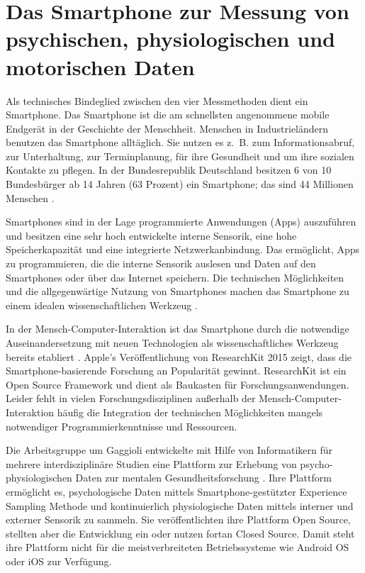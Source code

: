 

\section{Das Smartphone zur Messung von psychischen, physiologischen und motorischen Daten} 

\label{sec:das_smartphone_zur_messung_von_psychischen_physiologischen_und_motorischen_daten}

Als technisches Bindeglied zwischen den vier Messmethoden dient ein Smartphone. Das Smartphone ist die am schnellsten angenommene mobile Endgerät in der Geschichte der Menschheit. Menschen in Industrieländern benutzen das Smartphone alltäglich. Sie nutzen es z.~B. zum Informationsabruf, zur Unterhaltung, zur Terminplanung, für ihre Gesundheit und um ihre sozialen Kontakte zu pflegen. In der Bundesrepublik Deutschland besitzen 6 von 10 Bundesbürger ab 14 Jahren (63 Prozent) ein Smartphone; das sind 44 Millionen Menschen \citep{bitkom2015}.

Smartphones sind in der Lage programmierte Anwendungen (Apps) auszuführen und besitzen eine sehr hoch entwickelte interne Sensorik, eine hohe Speicherkapazität und eine integrierte Netzwerkanbindung. Das ermöglicht, Apps zu programmieren, die die interne Sensorik auslesen und Daten auf den Smartphones oder über das Internet speichern. Die technischen Möglichkeiten und die allgegenwärtige Nutzung von Smartphones machen das Smartphone zu einem idealen wissenschaftlichen Werkzeug \citep{Raento2009}.

In der Mensch-Computer-Interaktion ist das Smartphone durch die notwendige Auseinandersetzung mit neuen Technologien als wissenschaftliches Werkzeug bereits etabliert \citep{Froehlich2007}. Apple's Veröffentlichung von ResearchKit 2015 zeigt, dass die Smartphone-basierende Forschung an Popularität gewinnt. ResearchKit ist ein Open Source Framework und dient als Baukasten für Forschungsanwendungen. Leider fehlt in vielen Forschungsdisziplinen außerhalb der Mensch-Computer-Interaktion häufig die Integration der technischen Möglichkeiten mangels notwendiger Programmierkenntnisse und Ressourcen.

Die Arbeitsgruppe um Gaggioli entwickelte mit Hilfe von Informatikern für mehrere interdisziplinäre Studien eine Plattform zur Erhebung von psycho-physiologischen Daten zur mentalen Gesundheitsforschung \citep{Gaggioli2013}. Ihre Plattform ermöglicht es, psychologische Daten mittels Smartphone-gestützter Experience Sampling Methode und kontinuierlich physiologische Daten mittels interner und externer Sensorik zu sammeln. Sie veröffentlichten ihre Plattform Open Source, stellten aber die Entwicklung ein oder nutzen fortan Closed Source. Damit steht ihre Plattform nicht für die meistverbreiteten Betriebssysteme wie Android OS oder iOS zur Verfügung.

